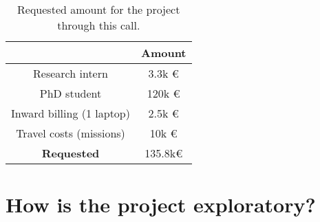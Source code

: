 \documentclass[11pt]{article}
\begin{document}
\begin{table}[h]
	\vspace*{-0.3cm}\begin{center}
		\begin{tabular}{|c|c|}
			\hline
			& Amount\\ \hline
			Research intern & 3.3k \euro \\ \hline
			PhD student & 120k \euro \\ \hline
			Inward billing (1 laptop) & 2.5k \euro \\ \hline
			Travel costs (missions) & 10k \euro \\ \hline
			\textbf{Requested} & 135.8k\euro\\ \hline
		\end{tabular}\vspace*{-0.15cm}
		\caption{Requested amount for the project through this call.\label{tab:reqcost}}
	\end{center}
\end{table}





\section{How is the project exploratory?}

\end{document}

